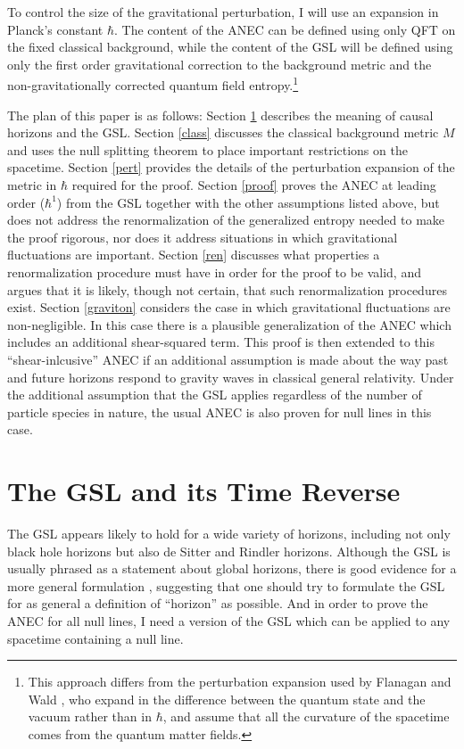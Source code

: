 \documentclass{article}
\begin{document}
To control the size of the gravitational perturbation, I will use an expansion in Planck's constant $\hbar$.  The content of the ANEC can be defined using only QFT on the fixed classical background, while the content of the GSL will be defined using only the first order gravitational correction to the background metric and the non-gravitationally corrected quantum field entropy.\footnote{This approach differs from the perturbation expansion used by Flanagan and Wald \cite{FM96}, who expand in the difference between the quantum state and the vacuum rather than in $\hbar$, and assume that all the curvature of the spacetime comes from the quantum matter fields.}

The plan of this paper is as follows: Section \ref{gsls} describes the meaning of causal horizons and the GSL.  Section \ref{class} discusses the classical background metric $M$ and uses the null splitting theorem to place important restrictions on the spacetime.  Section \ref{pert} provides the details of the perturbation expansion of the metric in $\hbar$ required for the proof.  Section \ref{proof} proves the ANEC at leading order ($\hbar^{1}$) from the GSL together with the other assumptions listed above, but does not address the renormalization of the generalized entropy needed to make the proof rigorous, nor does it address situations in which gravitational fluctuations are important.  Section \ref{ren} discusses what properties a renormalization procedure must have in order for the proof to be valid, and argues that it is likely, though not certain, that such renormalization procedures exist.  Section \ref{graviton} considers the case in which gravitational fluctuations are non-negligible.  In this case there is a plausible generalization of the ANEC which includes an additional shear-squared term.  This proof is then extended to this ``shear-inlcusive'' ANEC if an additional assumption is made about the way past and future horizons respond to gravity waves in classical general relativity.  Under the additional assumption that the GSL applies regardless of the number of particle species in nature, the usual ANEC is also proven for null lines in this case.

\section{The GSL and its Time Reverse}\label{gsls}

The GSL appears likely to hold for a wide variety of horizons, including not only black hole horizons but also de Sitter and Rindler horizons.  Although the GSL is usually phrased as a statement about global horizons, there is good evidence for a more general formulation \cite{JP03}, suggesting that one should try to formulate the GSL for as general a definition of ``horizon'' as possible.  And in order to prove the ANEC for all null lines, I need a version of the GSL which can be applied to any spacetime containing a null line.
\end{document}
